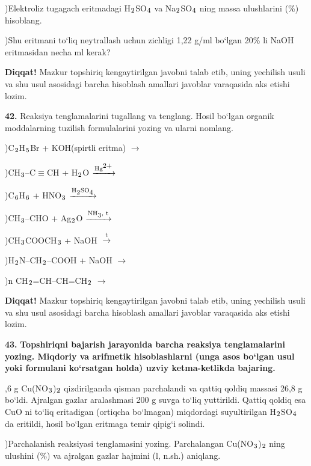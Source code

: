 \documentclass[11pt,a4paper]{article}
\renewcommand{\textsubscript}[1]{\ensuremath{_{\text{\fontsize{8}{8}\selectfont #1}}}}
\renewcommand{\textsuperscript}[1]{\ensuremath{^{\text{\fontsize{8}{8}\selectfont #1}}}}
\newcommand{\diqqat}[1]{\par\smallskip\noindent\textbf{Diqqat!} #1\par\medskip}
\begin{document}
)Elektroliz tugagach eritmadagi H\textsubscript{2}SO\textsubscript{4} va Na\textsubscript{2}SO\textsubscript{4} ning massa ulushlarini (\%) hisoblang.\par
{})Shu eritmani to`liq neytrallash uchun zichligi 1,22 g/ml bo`lgan 20\% li NaOH eritmasidan necha ml kerak?\par
\diqqat{Mazkur topshiriq kengaytirilgan javobni talab etib, uning yechilish usuli va shu usul asosidagi barcha hisoblash amallari javoblar varaqasida aks etishi lozim.}
\noindent\textbf{42.} Reaksiya tenglamalarini tugallang va tenglang. Hosil bo`lgan organik moddalarning tuzilish formulalarini yozing va ularni nomlang.\par
{})C\textsubscript{2}H\textsubscript{5}Br + KOH(spirtli eritma) $\to$\par
{})CH\textsubscript{3}--C$\equiv$CH + H\textsubscript{2}O $\xrightarrow{\text{Hg\textsuperscript{2+}}}$\par
{})C\textsubscript{6}H\textsubscript{6} + HNO\textsubscript{3} $\xrightarrow{\text{H\textsubscript{2}SO\textsubscript{4}}}$\par
{})CH\textsubscript{3}--CHO + Ag\textsubscript{2}O $\xrightarrow{\text{NH\textsubscript{3}, t}}$\par
{})CH\textsubscript{3}COOCH\textsubscript{3} + NaOH $\xrightarrow{\text{t}}$\par
{})H\textsubscript{2}N--CH\textsubscript{2}--COOH + NaOH $\to$\par
{})n CH\textsubscript{2}=CH--CH=CH\textsubscript{2} $\to$\par
\diqqat{Mazkur topshiriq kengaytirilgan javobni talab etib, uning yechilish usuli va shu usul asosidagi barcha hisoblash amallari javoblar varaqasida aks etishi lozim.}
\noindent\textbf{43.} \textbf{Topshiriqni bajarish jarayonida barcha reaksiya tenglamalarini yozing. Miqdoriy va arifmetik hisoblashlarni (unga asos bo`lgan usul yoki formulani ko`rsatgan holda) uzviy ketma-ketlikda bajaring.}\par{},6 g Cu(NO\textsubscript{3})\textsubscript{2} qizdirilganda qisman parchalandi va qattiq qoldiq massasi 26,8 g bo`ldi. Ajralgan gazlar aralashmasi 200 g suvga to`liq yuttirildi. Qattiq qoldiq esa CuO ni to`liq eritadigan (ortiqcha bo`lmagan) miqdordagi suyultirilgan H\textsubscript{2}SO\textsubscript{4} da eritildi, hosil bo`lgan eritmaga temir qipig`i solindi.\par
{})Parchalanish reaksiyasi tenglamasini yozing. Parchalangan Cu(NO\textsubscript{3})\textsubscript{2} ning ulushini (\%) va ajralgan gazlar hajmini (l, n.sh.) aniqlang.\par
\end{document}
